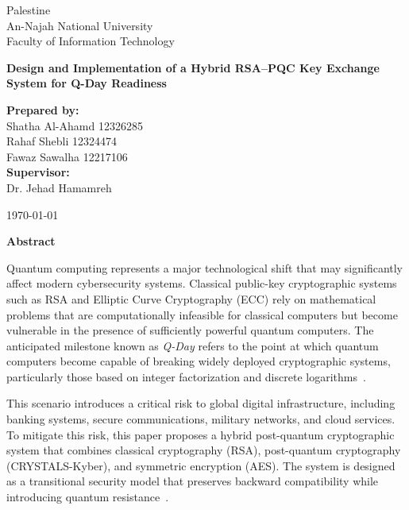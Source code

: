 \documentclass[12pt,a4paper]{article}
\begin{document}
\begin{titlepage}
    \centering
    {\large Palestine\\[0.5em]}
    {\large An-Najah National University\\[0.5em]}
    {\large Faculty of Information Technology\\[3em]}

    {\LARGE \textbf{Design and Implementation of a Hybrid RSA--PQC Key Exchange System for Q-Day Readiness}\\[2.5em]}

    \begin{flushleft}
    \textbf{Prepared by:}\\
    Shatha Al-Ahamd \hfill 12326285\\
    Rahaf Shebli \hfill 12324474\\
    Fawaz Sawalha \hfill 12217106\\[1.5em]

    \textbf{Supervisor:}\\
    Dr. Jehad Hamamreh
    \end{flushleft}

    \vfill
    {\large \today}
\end{titlepage}

\begin{center}
    {\LARGE \textbf{Abstract}}
\end{center}

Quantum computing represents a major technological shift that may significantly affect modern cybersecurity systems. Classical public-key cryptographic systems such as RSA and Elliptic Curve Cryptography (ECC) rely on mathematical problems that are computationally infeasible for classical computers but become vulnerable in the presence of sufficiently powerful quantum computers. The anticipated milestone known as \emph{Q-Day} refers to the point at which quantum computers become capable of breaking widely deployed cryptographic systems, particularly those based on integer factorization and discrete logarithms~\cite{shor1994,shor1997}.

This scenario introduces a critical risk to global digital infrastructure, including banking systems, secure communications, military networks, and cloud services. To mitigate this risk, this paper proposes a hybrid post-quantum cryptographic system that combines classical cryptography (RSA), post-quantum cryptography (CRYSTALS-Kyber), and symmetric encryption (AES). The system is designed as a transitional security model that preserves backward compatibility while introducing quantum resistance~\cite{nistir8105,stebila2017}.
\end{document}
